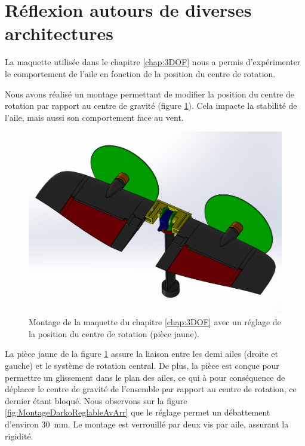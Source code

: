\section{Réflexion autours de diverses architectures}
{\color{blue}
La maquette utilisée dans le chapitre \ref{chap:3DOF} nous a permis d'expérimenter le comportement de l'aile en fonction de la position du centre de rotation.

Nous avons réalisé un montage permettant de modifier la position du centre de rotation par rapport au centre de gravité (figure \ref{fig:MontageDarkoReglable}). Cela impacte la stabilité de l'aile, mais aussi son comportement face au vent. 


\begin{figure}[ht!]
    \centering
   \includegraphics[width=0.8\columnwidth]{figures/vueMaquetteDarkoReglage.png}
    \caption{Montage de la maquette du chapitre \ref{chap:3DOF} avec un réglage de la position du centre de rotation (pièce jaune).}
    \label{fig:MontageDarkoReglable}
\end{figure}
La pièce jaune de la figure \ref{fig:MontageDarkoReglable} assure la liaison entre les demi ailes (droite et gauche) et le système de rotation central. De plus, la pièce est conçue pour permettre un glissement dans le plan des ailes, ce qui à pour conséquence de déplacer le centre de gravité de l'ensemble par rapport au centre de rotation, ce dernier étant bloqué. Nous observons sur la figure \ref{fig:MontageDarkoReglableAvArr} que le réglage permet un débattement d'environ \SI{30}{\milli\meter}. Le montage est verrouillé par deux vis par aile, assurant la rigidité.

}
